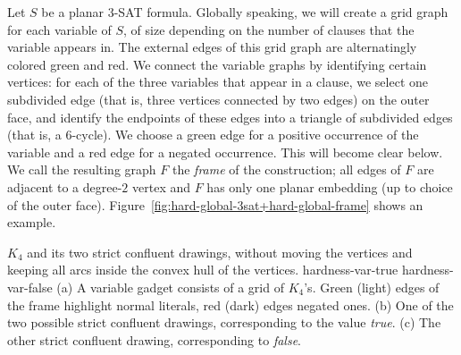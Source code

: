 \documentclass{llncs}
\begin{document}
Let $S$ be a planar 3-SAT formula. Globally speaking, we will create a grid graph for each variable of $S$, of size depending on the number of clauses that the variable appears in. The external edges of this grid graph are alternatingly colored green and red.
We connect the variable graphs by identifying certain vertices: for each of the three variables that appear in a clause, we select one subdivided edge (that is, three vertices connected by two edges) on the outer face, and identify the endpoints of these edges into a triangle of subdivided edges (that is, a $6$-cycle). We choose a green edge for a positive occurrence of the variable and a red edge for a negated occurrence. This will become clear below.
We call the resulting graph $F$ the \emph {frame} of the construction; all edges of $F$ are adjacent to a degree-$2$ vertex and $F$ has only one planar embedding (up to choice of the outer face).
Figure~\ref {fig:hard-global-3sat+hard-global-frame} shows an example.

 {$K_4$ and its two strict confluent drawings, without moving the vertices and keeping all arcs inside the convex hull of the vertices.}
 {hardness-var-true} {hardness-var-false}
{ (a) A variable gadget consists of a grid of $K_4$'s. Green (light) edges of the frame highlight normal literals, red (dark) edges negated ones.
  (b) One of the two possible strict  confluent drawings, corresponding to the value \emph {true}.
  (c) The other strict confluent drawing, corresponding to \emph {false}.
}
\end{document}
